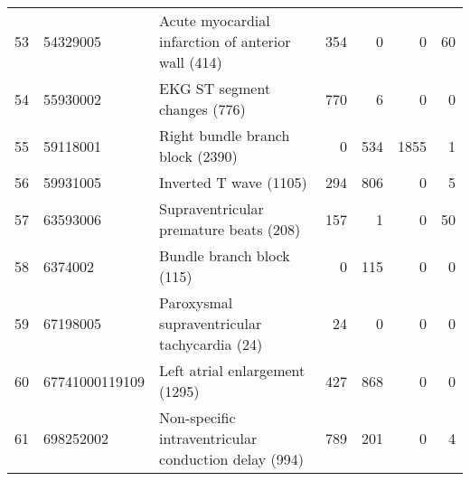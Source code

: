 \begin{tabular}{lllrrrr}
53 & 54329005 & Acute myocardial infarction of anterior wall (414) & {\cellcolor[HTML]{2E8B57}} \color[HTML]{F1F1F1} 354 & {\cellcolor[HTML]{EBF3ED}} \color[HTML]{000000} 0 & {\cellcolor[HTML]{EBF3ED}} \color[HTML]{000000} 0 & {\cellcolor[HTML]{CBE1D4}} \color[HTML]{000000} 60 \\
54 & 55930002 & EKG ST segment changes (776) & {\cellcolor[HTML]{2E8B57}} \color[HTML]{F1F1F1} 770 & {\cellcolor[HTML]{EAF2ED}} \color[HTML]{000000} 6 & {\cellcolor[HTML]{EBF3ED}} \color[HTML]{000000} 0 & {\cellcolor[HTML]{EBF3ED}} \color[HTML]{000000} 0 \\
55 & 59118001 & Right bundle branch block (2390) & {\cellcolor[HTML]{EBF3ED}} \color[HTML]{000000} 0 & {\cellcolor[HTML]{B5D5C2}} \color[HTML]{000000} 534 & {\cellcolor[HTML]{2E8B57}} \color[HTML]{F1F1F1} 1855 & {\cellcolor[HTML]{EBF3ED}} \color[HTML]{000000} 1 \\
56 & 59931005 & Inverted T wave (1105) & {\cellcolor[HTML]{A6CDB6}} \color[HTML]{000000} 294 & {\cellcolor[HTML]{2E8B57}} \color[HTML]{F1F1F1} 806 & {\cellcolor[HTML]{EBF3ED}} \color[HTML]{000000} 0 & {\cellcolor[HTML]{EAF2ED}} \color[HTML]{000000} 5 \\
57 & 63593006 & Supraventricular premature beats (208) & {\cellcolor[HTML]{2E8B57}} \color[HTML]{F1F1F1} 157 & {\cellcolor[HTML]{EAF2ED}} \color[HTML]{000000} 1 & {\cellcolor[HTML]{EBF3ED}} \color[HTML]{000000} 0 & {\cellcolor[HTML]{AFD2BD}} \color[HTML]{000000} 50 \\
58 & 6374002 & Bundle branch block (115) & {\cellcolor[HTML]{EBF3ED}} \color[HTML]{000000} 0 & {\cellcolor[HTML]{2E8B57}} \color[HTML]{F1F1F1} 115 & {\cellcolor[HTML]{EBF3ED}} \color[HTML]{000000} 0 & {\cellcolor[HTML]{EBF3ED}} \color[HTML]{000000} 0 \\
59 & 67198005 & Paroxysmal supraventricular tachycardia (24) & {\cellcolor[HTML]{2E8B57}} \color[HTML]{F1F1F1} 24 & {\cellcolor[HTML]{EBF3ED}} \color[HTML]{000000} 0 & {\cellcolor[HTML]{EBF3ED}} \color[HTML]{000000} 0 & {\cellcolor[HTML]{EBF3ED}} \color[HTML]{000000} 0 \\
60 & 67741000119109 & Left atrial enlargement (1295) & {\cellcolor[HTML]{8EC0A4}} \color[HTML]{000000} 427 & {\cellcolor[HTML]{2E8B57}} \color[HTML]{F1F1F1} 868 & {\cellcolor[HTML]{EBF3ED}} \color[HTML]{000000} 0 & {\cellcolor[HTML]{EBF3ED}} \color[HTML]{000000} 0 \\
61 & 698252002 & Non-specific intraventricular conduction delay (994) & {\cellcolor[HTML]{2E8B57}} \color[HTML]{F1F1F1} 789 & {\cellcolor[HTML]{BBD8C7}} \color[HTML]{000000} 201 & {\cellcolor[HTML]{EBF3ED}} \color[HTML]{000000} 0 & {\cellcolor[HTML]{EAF2ED}} \color[HTML]{000000} 4 \\

\end{tabular}
